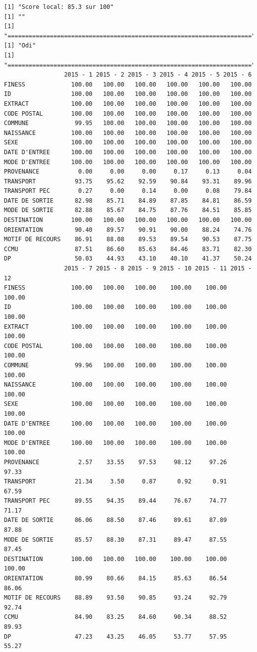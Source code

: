 \documentclass[]{article}
\begin{document}
\begin{verbatim}
[1] "Score local: 85.3 sur 100"
[1] ""
[1] "====================================================================="
[1] "Odi"
[1] "====================================================================="
                 2015 - 1 2015 - 2 2015 - 3 2015 - 4 2015 - 5 2015 - 6
FINESS             100.00   100.00   100.00   100.00   100.00   100.00
ID                 100.00   100.00   100.00   100.00   100.00   100.00
EXTRACT            100.00   100.00   100.00   100.00   100.00   100.00
CODE POSTAL        100.00   100.00   100.00   100.00   100.00   100.00
COMMUNE             99.95   100.00   100.00   100.00   100.00   100.00
NAISSANCE          100.00   100.00   100.00   100.00   100.00   100.00
SEXE               100.00   100.00   100.00   100.00   100.00   100.00
DATE D'ENTREE      100.00   100.00   100.00   100.00   100.00   100.00
MODE D'ENTREE      100.00   100.00   100.00   100.00   100.00   100.00
PROVENANCE           0.00     0.00     0.00     0.17     0.13     0.04
TRANSPORT           93.75    95.62    92.59    90.84    93.31    89.96
TRANSPORT PEC        0.27     0.00     0.14     0.00     0.08    79.84
DATE DE SORTIE      82.98    85.71    84.89    87.85    84.81    86.59
MODE DE SORTIE      82.88    85.67    84.75    87.76    84.51    85.85
DESTINATION        100.00   100.00   100.00   100.00   100.00   100.00
ORIENTATION         90.40    89.57    90.91    90.00    88.24    74.76
MOTIF DE RECOURS    86.91    88.08    89.53    89.54    90.53    87.75
CCMU                87.51    86.60    85.63    84.46    83.71    82.30
DP                  50.03    44.93    43.10    40.10    41.37    50.24
                 2015 - 7 2015 - 8 2015 - 9 2015 - 10 2015 - 11 2015 - 12
FINESS             100.00   100.00   100.00    100.00    100.00    100.00
ID                 100.00   100.00   100.00    100.00    100.00    100.00
EXTRACT            100.00   100.00   100.00    100.00    100.00    100.00
CODE POSTAL        100.00   100.00   100.00    100.00    100.00    100.00
COMMUNE             99.96   100.00   100.00    100.00    100.00    100.00
NAISSANCE          100.00   100.00   100.00    100.00    100.00    100.00
SEXE               100.00   100.00   100.00    100.00    100.00    100.00
DATE D'ENTREE      100.00   100.00   100.00    100.00    100.00    100.00
MODE D'ENTREE      100.00   100.00   100.00    100.00    100.00    100.00
PROVENANCE           2.57    33.55    97.53     98.12     97.26     97.33
TRANSPORT           21.34     3.50     0.87      0.92      0.91     67.59
TRANSPORT PEC       89.55    94.35    89.44     76.67     74.77     71.17
DATE DE SORTIE      86.06    88.50    87.46     89.61     87.89     87.88
MODE DE SORTIE      85.57    88.30    87.31     89.47     87.55     87.45
DESTINATION        100.00   100.00   100.00    100.00    100.00    100.00
ORIENTATION         80.99    80.66    84.15     85.63     86.54     86.06
MOTIF DE RECOURS    88.89    93.50    90.85     93.24     92.79     92.74
CCMU                84.90    83.25    84.60     90.34     88.52     89.93
DP                  47.23    43.25    46.05     53.77     57.95     55.27
\end{verbatim}
\end{document}
